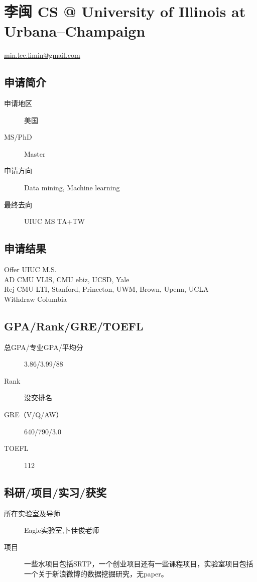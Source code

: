 \documentclass[11pt,fleqn,openany]{book} %
\begin{document}
\section{李闽 CS @ University of Illinois at Urbana--Champaign}
\hfill \href{mailto:min.lee.limin@gmail.com}{min.lee.limin@gmail.com}

\noindent\begin{minipage}[t]{0.45\textwidth}
\subsection*{申请简介}
\begin{description}
\item[申请地区] 美国
\item[MS/PhD] Master
\item[申请方向] Data mining, Machine learning
\item[最终去向] UIUC MS TA+TW
\end{description}
\end{minipage}
\hfill
\begin{minipage}[t]{0.45\textwidth}
\subsection*{申请结果}
\noindent Offer UIUC M.S.\\
AD CMU VLIS, CMU ebiz, UCSD, Yale\\
Rej CMU LTI, Stanford, Princeton, UWM, Brown, Upenn, UCLA\\
Withdraw Columbia
\end{minipage}
\subsection*{GPA/Rank/GRE/TOEFL}
\begin{description}
\item[总GPA/专业GPA/平均分] 3.86/3.99/88
\item[Rank] 没交排名
\item[GRE（V/Q/AW）] 640/790/3.0
\item[TOEFL] 112
\end{description}

\subsection*{科研/项目/实习/获奖}
\begin{description}
\item[所在实验室及导师] Eagle实验室,卜佳俊老师
\item[项目] 一些水项目包括SRTP，一个创业项目还有一些课程项目，实验室项目包括一个关于新浪微博的数据挖掘研究，无paper。
\end{description}
\end{document}
